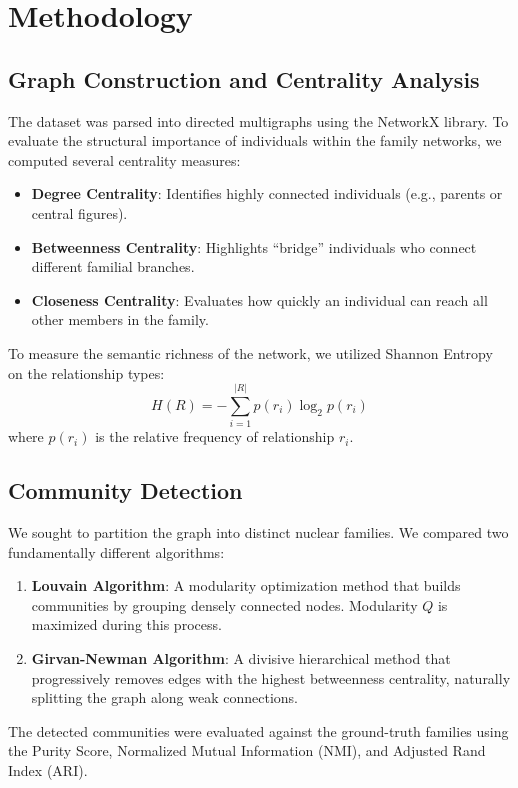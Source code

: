 \documentclass[10pt,twocolumn,letterpaper]{article}
\begin{document}
\section{Methodology}

\subsection{Graph Construction and Centrality Analysis}
The dataset was parsed into directed multigraphs using the NetworkX library. To evaluate the structural importance of individuals within the family networks, we computed several centrality measures:
\begin{itemize}
    \item \textbf{Degree Centrality}: Identifies highly connected individuals (e.g., parents or central figures).
    \item \textbf{Betweenness Centrality}: Highlights ``bridge'' individuals who connect different familial branches.
    \item \textbf{Closeness Centrality}: Evaluates how quickly an individual can reach all other members in the family.
\end{itemize}
To measure the semantic richness of the network, we utilized Shannon Entropy on the relationship types:
\begin{equation}
    H(R) = -\sum_{i=1}^{|R|} p(r_i) \log_2 p(r_i)
\end{equation}
where $p(r_i)$ is the relative frequency of relationship $r_i$.

\subsection{Community Detection}
We sought to partition the graph into distinct nuclear families. We compared two fundamentally different algorithms:
\begin{enumerate}
    \item \textbf{Louvain Algorithm}: A modularity optimization method that builds communities by grouping densely connected nodes. Modularity $Q$ is maximized during this process.
    \item \textbf{Girvan-Newman Algorithm}: A divisive hierarchical method that progressively removes edges with the highest betweenness centrality, naturally splitting the graph along weak connections.
\end{enumerate}
The detected communities were evaluated against the ground-truth families using the Purity Score, Normalized Mutual Information (NMI), and Adjusted Rand Index (ARI).
\end{document}
